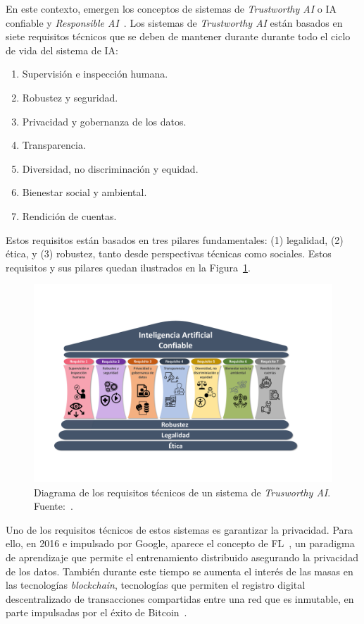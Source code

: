 En este contexto, emergen los conceptos de sistemas de \textit{Trustworthy AI} o \ac{IA} confiable y \textit{Responsible AI}~\cite{trusworth}. Los sistemas de \textit{Trustworthy AI} están basados en siete requisitos técnicos que se deben de mantener durante durante todo el ciclo de vida del sistema de \ac{IA}: 
\begin{enumerate}
    \item Supervisión e inspección humana.
    \item Robustez y seguridad.
    \item Privacidad y gobernanza de los datos.
    \item Transparencia.
    \item Diversidad, no discriminación y equidad.
    \item Bienestar social y ambiental.
    \item Rendición de cuentas.
\end{enumerate}

Estos requisitos están basados en tres pilares fundamentales: (1) legalidad, (2) ética, y (3) robustez, tanto desde perspectivas técnicas como sociales. Estos requisitos y sus pilares quedan ilustrados en la Figura~\ref{fig:tai}.
\begin{figure}
    \centering
    \includegraphics[width=\textwidth]{figuras/TAI.pdf}
    \caption{Diagrama de los requisitos técnicos de un sistema de \textit{Trusworthy AI}. Fuente:~\cite{diaz-tai}.}
    \label{fig:tai}
\end{figure}

Uno de los requisitos técnicos de estos sistemas es garantizar la privacidad. Para ello, en 2016 e impulsado por Google, aparece el concepto de \ac{FL}~\cite{mcmahan-2023}, un paradigma de aprendizaje que permite el entrenamiento distribuido asegurando la privacidad de los datos. También durante este tiempo se aumenta el interés de las masas en las tecnologías \textit{blockchain}, tecnologías que permiten el registro digital descentralizado de transacciones compartidas entre una red que es inmutable, en parte impulsadas por el éxito de Bitcoin~\cite{bitcoin}.

